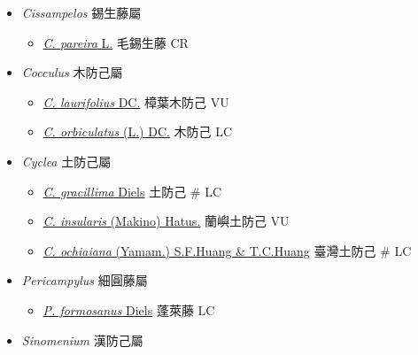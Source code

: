 
  \begin{itemize}
 \item[] \textit{Cissampelos} 錫生藤屬 
                                
  \begin{itemize}
        \item[] \href{http://www.theplantlist.org/tpl1.1/search?q=Cissampelos+pareira}{\textit{C. pareira} L.}   毛錫生藤   CR
  \end{itemize}
 \item[] \textit{Cocculus} 木防己屬
                                
  \begin{itemize}
        \item[] \href{http://www.theplantlist.org/tpl1.1/search?q=Cocculus+laurifolius}{\textit{C. laurifolius} DC.}   樟葉木防己   VU
        \item[] \href{http://www.theplantlist.org/tpl1.1/search?q=Cocculus+orbiculatus}{\textit{C. orbiculatus} (L.) DC.}   木防己   LC
  \end{itemize}
 \item[] \textit{Cyclea} 土防己屬
                                
  \begin{itemize}
        \item[] \href{http://www.theplantlist.org/tpl1.1/search?q=Cyclea+gracillima}{\textit{C. gracillima} Diels}   土防己  \# LC
        \item[] \href{http://www.theplantlist.org/tpl1.1/search?q=Cyclea+insularis}{\textit{C. insularis} (Makino) Hatus.}   蘭嶼土防己   VU
        \item[] \href{http://www.theplantlist.org/tpl1.1/search?q=Cyclea+ochiaiana}{\textit{C. ochiaiana} (Yamam.) S.F.Huang \& T.C.Huang}   臺灣土防己  \# LC
  \end{itemize}
 \item[] \textit{Pericampylus} 細圓藤屬
                                
  \begin{itemize}
        \item[] \href{http://www.theplantlist.org/tpl1.1/search?q=Pericampylus+formosanus}{\textit{P. formosanus} Diels}   蓬萊藤   LC
  \end{itemize}
 \item[] \textit{Sinomenium} 漢防己屬
                                

\end{itemize}
